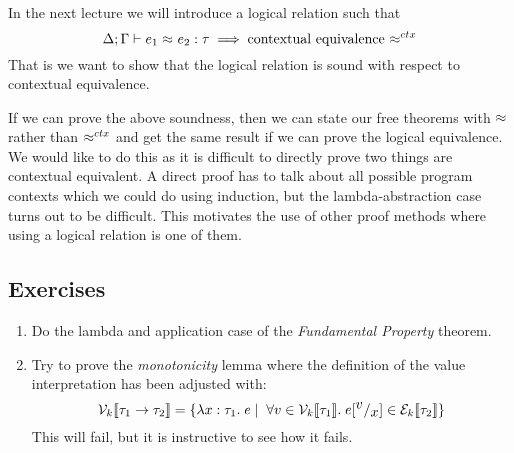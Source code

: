In the next lecture we will introduce a logical relation such that
\[
  \Delta ; \Gamma \vdash e_1 \approx^{} e_2 : \tau \implies \text{contextual equivalence \ensuremath{ \approx^{ctx} }} 
\]
That is we want to show that the logical relation is sound with respect to contextual equivalence. 

If we can prove the above soundness, then we can state our free theorems with $ \approx^{} $ rather than $ \approx^{ctx} $ and get the same result if we can prove the logical equivalence. We would like to do this as it is difficult to directly prove two things are contextual equivalent. A direct proof has to talk about all possible program contexts which we could do using induction, but the lambda-abstraction case turns out to be difficult. This motivates the use of other proof methods where using a logical relation is one of them.

\subsection*{Exercises}
\begin{enumerate}
\item Do the lambda and application case of the \emph{Fundamental Property} theorem.%
\item Try to prove the \emph{monotonicity} lemma where the definition of the value interpretation has been adjusted with:
\[
\mathcal{V}_{k}\llbracket  \tau_1 \rightarrow \tau_2 \rrbracket = \{\lambda x : \tau_1 . \; e \; | \; \; \forall v \in \mathcal{V}_{k}\llbracket \tau_1 \rrbracket. \; e[^{\textstyle v}/_{\textstyle x}] \in \mathcal{E}_{k}\llbracket \tau_2 \rrbracket \}
\]
This will fail, but it is instructive to see how it fails.
\end{enumerate}


\clearpage
